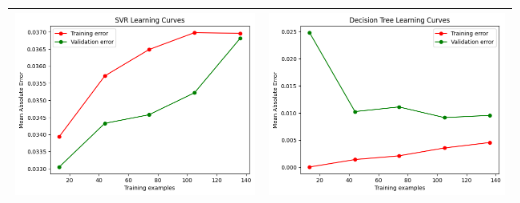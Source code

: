 \begin{table}[H]
    \centering
    \footnotesize
    \setlength\tabcolsep{0pt}
    \begin{tabularx}{\textwidth}{|X|X|}
        \hline
        \includegraphics[width=\linewidth, trim=0 0 0 0]{images/SVR_lc60_ridotto.png} &
        \includegraphics[width=\linewidth, trim=0 0 0 0]{images/DecisionTree_lc60_ridotto.png} \\
        \hline

\end{tabularx}
\end{table}
